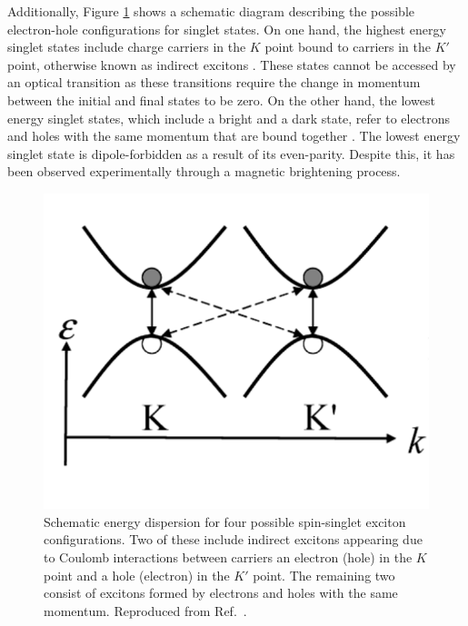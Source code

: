 Additionally, Figure \ref{fig:exciton_transitions} shows a schematic diagram describing the possible electron-hole configurations for singlet states. On one hand, the highest energy singlet states include charge carriers in the $K$ point bound to carriers in the $K'$ point, otherwise known as indirect excitons \cite{srivastava2008direct}. These states cannot be accessed by an optical transition as these transitions require the change in momentum between the initial and final states to be zero. On the other hand, the lowest energy singlet states, which include a bright and a dark state, refer to electrons and holes with the same momentum that are bound together \cite{srivastava2008direct}. The lowest energy singlet state is dipole-forbidden as a result of its even-parity. Despite this, it has been observed experimentally through a magnetic brightening process.

\begin{figure}[ht]
	\centering
	\includegraphics[scale=0.4]{images/chapter_optical_props/exciton_schematic_srivastava}
	\caption{Schematic energy dispersion for four possible spin-singlet exciton configurations. Two of these include indirect excitons appearing due to Coulomb interactions between carriers an electron (hole) in the $K$ point and a hole (electron) in the $K'$ point. The remaining two consist of excitons formed by electrons and holes with the same momentum. Reproduced from Ref.\ \cite{srivastava2008direct}.}
	\label{fig:exciton_transitions}
\end{figure}

